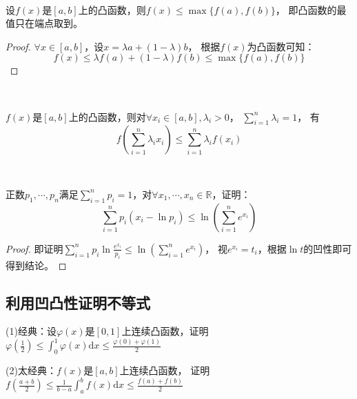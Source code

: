 ~

\begin{theorem}[凸函数的最值]
  设$f(x)$是$[a,b]$上的凸函数，则$f(x) \leq \max \{f(a),f(b)\}$，
  即凸函数的最值只在端点取到。
\end{theorem}

\begin{proof}
  $\forall x \in [a,b]$，设$x = \lambda a + (1 - \lambda)b$，
  根据$f(x)$为凸函数可知：
  \begin{equation*}
    f(x) \leq \lambda f(a) + (1 - \lambda)f(b) \leq \max \{f(a),f(b)\}
  \end{equation*}
\end{proof}

~

\begin{theorem}[Jensen不等式]
  $f(x)$是$[a,b]$上的凸函数，则对$\forall x_i \in [a,b], \lambda_i > 0$，
  $\sum\limits_{i = 1}^n \lambda_i = 1$，
  有
  \begin{equation*}
    f \left( \sum\limits_{i = 1}^n \lambda_ix_i \right) \leq \sum\limits_{i = 1}^n \lambda_i f(x_i)
  \end{equation*}
\end{theorem}

~

\begin{exercise}[Jensen不等式经典题]
  正数$p_1,\cdots,p_n$满足$\sum\limits_{i = 1}^n p_i = 1$，对$\forall x_1,\cdots,x_n \in \mathbb{R}$，证明：
  \begin{equation*}
    \sum\limits_{i = 1}^n p_i(x_i - \ln p_i) \leq \ln \left( \sum\limits_{i = 1}^n e^{x_i} \right)
  \end{equation*}
\end{exercise}

\begin{proof}
  即证明$\sum\limits_{i =1}^n p_i \ln \frac{e^{x_i}}{p_i} \leq \ln \left( \sum\limits_{i = 1}^n e^{x_i} \right)$，
  视$e^{x_i} = t_i$，根据$\ln t$的凹性即可得到结论。
\end{proof}

\subsection{利用凹凸性证明不等式}

\begin{exercise}[对中点位置的估计]
  (1)经典：设$\varphi(x)$是$[0,1]$上连续凸函数，证明$\varphi \left( \frac{1}{2} \right) \leq \int_0^1 \varphi(x) \mathrm{d} x \leq \frac{\varphi(0) + \varphi(1)}{2}$

  (2)太经典：$f(x)$是$[a,b]$上连续凸函数，
  证明$f \left( \frac{a+b}{2} \right) \leq \frac{1}{b-a}\int_a^b f(x)\mathrm{d} x \leq \frac{f(a) + f(b)}{2}$
\end{exercise}

